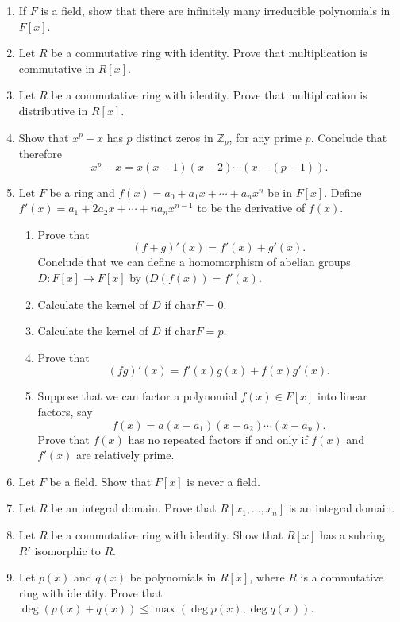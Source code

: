 {\begin{enumerate}
\item
If $F$ is a field, show that there are infinitely many irreducible polynomials in $F[x]$.

\item
Let $R$ be a commutative ring with identity. Prove that multiplication is commutative in $R[x]$.

\item
Let $R$ be a commutative ring with identity. Prove that multiplication is distributive in $R[x]$.
 
\item
Show that $x^p - x$ has $p$ distinct zeros in ${\mathbb Z}_p$, for any prime $p$.  Conclude that therefore
\[
x^p-x = x(x-1)(x-2) \cdots (x - (p - 1)).
\]
 
\item
Let $F$ be a ring and $f(x) = a_0 + a_1 x + \cdots + a_n x^n$ be in $F[x]$. Define $f'(x) = a_1  + 2 a_2 x + \cdots + n a_n x^{n - 1}$ to be the {\bfi derivative\/} of $f(x)$. 
\begin{enumerate}
 
 \item
Prove that
\[
(f + g)'(x) = f'(x) + g'(x).
\]
Conclude that we can define a homomorphism of abelian groups $D : F[x] \rightarrow F[x]$ by $(D(f(x)) = f'(x)$.
 
 \item
Calculate the kernel of $D$ if $\mbox{char} F = 0$.
 
 \item
Calculate the kernel of $D$ if $\mbox{char} F = p$.
 
 \item
Prove that
\[
(fg)'(x) = f'(x)g(x) + f(x) g'(x).
\]
 
 \item
Suppose that we can factor a polynomial $f(x) \in F[x]$ into linear factors, say
\[
f(x) = a(x - a_1) (x - a_2) \cdots ( x - a_n).
\]
Prove that $f(x)$ has no repeated factors if and only if $f(x)$ and $f'(x)$ are relatively prime.
 
\end{enumerate}

\item
Let $F$ be a field. Show that $F[x]$ is never a field.

\item
Let $R$ be an integral domain.  Prove that $R[x_1, \ldots, x_n]$ is an integral domain.
 
\item
Let $R$ be a commutative ring with identity.  Show that $R[x]$ has a subring $R'$ isomorphic to $R$.
 
\item
Let $p(x)$ and $q(x)$ be polynomials in $R[x]$, where $R$ is a commutative ring with identity.  Prove that  $\deg( p(x) + q(x) ) \leq \max( \deg p(x), \deg q(x) )$. 

\end{enumerate}
}
 


